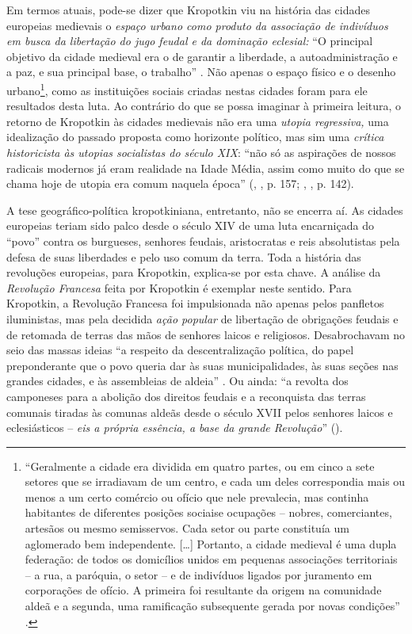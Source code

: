 Em termos atuais, pode-se dizer que Kropotkin viu na história das cidades europeias medievais o \textit{espaço urbano como produto da associação de indivíduos em busca da libertação do jugo feudal e da dominação eclesial: } ``O principal objetivo da cidade medieval era o de garantir a liberdade, a autoadministração e a paz, e sua principal base, o trabalho'' \cite[p.~142]{KROPOTKIN2009}. Não apenas o espaço físico e o desenho urbano\footnote{``Geralmente a cidade era dividida em quatro partes, ou em cinco a sete setores que se irradiavam de um centro, e cada um deles correspondia  mais ou menos a um certo comércio ou ofício que nele prevalecia, mas continha habitantes de diferentes posições sociaise ocupações -- nobres, comerciantes, artesãos ou mesmo semisservos. Cada setor ou parte constituía um aglomerado bem independente. [{\dots}] Portanto, a cidade medieval é uma dupla federação: de todos os domicílios unidos em pequenas associações territoriais -- a rua, a paróquia, o setor -- e de indivíduos ligados por juramento em corporações de ofício. A primeira foi resultante da origem na comunidade aldeã e a segunda, uma ramificação subsequente gerada por novas condições'' \cite[p.~142]{KROPOTKIN2009}.}, como as instituições sociais criadas nestas cidades foram para ele resultados desta luta. Ao contrário do que se possa imaginar à primeira leitura, o retorno de Kropotkin às cidades medievais não era uma \textit{utopia regressiva, }uma idealização do passado proposta como horizonte político, mas sim uma \textit{crítica historicista às utopias socialistas do século XIX}: ``não só as aspirações de nossos radicais modernos já eram realidade na Idade Média, assim como muito do que se chama hoje de utopia era comum naquela época'' (\citeauthor{KROPOTKIN2009}, \citeyear{KROPOTKIN2009}, p. 157; \citeauthor{HORNER1989}, \citeyear{HORNER1989}, p. 142).

A tese geográfico-política kropotkiniana, entretanto, não se encerra aí. As cidades europeias teriam sido palco desde o século XIV de uma luta encarniçada do ``povo'' contra os burgueses, senhores feudais, aristocratas e reis absolutistas pela defesa de suas liberdades e pelo uso comum da terra. Toda a história das revoluções europeias, para Kropotkin, explica-se por esta chave. A análise da  \textit{Revolução Francesa }feita por Kropotkin é exemplar neste sentido. Para Kropotkin, a Revolução Francesa foi impulsionada não apenas pelos panfletos iluministas, mas pela decidida \textit{ação popular }de libertação de obrigações feudais e de retomada de terras das mãos de senhores laicos e religiosos. Desabrochavam no seio das massas ideias ``a respeito da descentralização política, do papel preponderante que o povo queria dar às suas municipalidades, às suas seções nas grandes cidades, e às assembleias de aldeia'' \cite[p.~23]{KROPOTKIN1955}. Ou ainda: ``a revolta dos camponeses para a abolição dos direitos feudais e a reconquista das terras comunais tiradas às comunas aldeãs desde o século XVII pelos senhores laicos e eclesiásticos -- \textit{eis a própria essência, a base da grande Revolução}'' (). 

